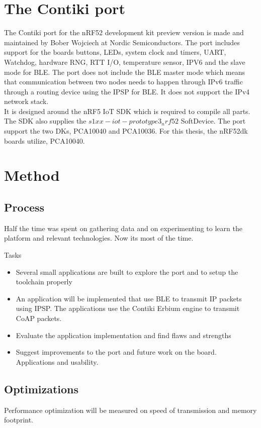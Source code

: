 \documentclass{article}
\begin{document}
\section{The Contiki port}
The Contiki port for the nRF52 development kit preview version is made and maintained by Bober Wojciech at Nordic Semiconductors. \cite{port}
The port includes support for the boards buttons, LEDs, system clock and timers, UART, Watchdog, hardware RNG, RTT I/O, temperature sensor, IPV6 and the slave mode for BLE. The port does not include the BLE master mode which means that communication between two nodes needs to happen through IPv6 traffic through a routing device using the IPSP for BLE. It does not support the IPv4 network stack.\\
It is designed around the nRF5 IoT SDK which is required to compile all parts. The SDK also supplies the $s1xx-iot-prototype3_nrf52$ SoftDevice.
The port support the two DKs, PCA10040 and PCA10036. For this thesis, the nRF52dk boards utilize, PCA10040.



\section{Method}
\subsection{Process}
Half the time was spent on gathering data and on experimenting to learn the platform and relevant technologies. %
Now its most of the time.

Tasks
\begin{itemize}
\item
Several small applications are built to explore the port and to setup the toolchain properly
\item
An application will be implemented that use BLE to transmit IP packets
using IPSP. The applications use the Contiki Erbium engine to transmit CoAP packets.
\item
Evaluate the application implementation and find flaws and strengths
\item
Suggest improvements to the port and future work on the board. Applications and usability.
\end{itemize}


\subsection{Optimizations}
Performance optimization will be measured on speed of transmission and memory footprint.
\end{document}
